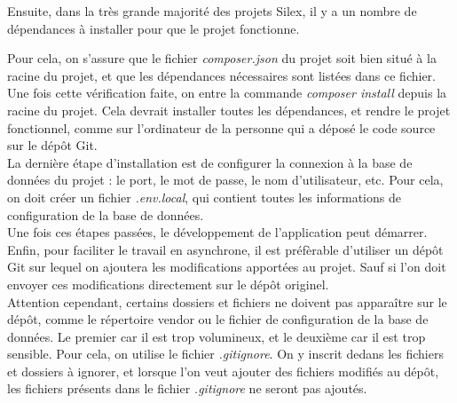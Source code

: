 \documentclass[12pt,a4paper]{article}
\begin{document}
	 Ensuite, dans la très grande majorité des projets Silex, il y a un nombre de dépendances à installer pour que le projet fonctionne. 
	
	Pour cela, on s'assure que le fichier \textit{composer.json} du projet soit bien situé à la racine du projet, et que les dépendances nécessaires sont listées dans ce fichier. Une fois cette vérification faite, on entre la commande \textit{composer install} depuis la racine du projet. Cela devrait installer toutes les dépendances, et rendre le projet fonctionnel, comme sur l'ordinateur de la personne qui a déposé le code source sur le dépôt Git. \\
	 
	 La dernière étape d'installation est de configurer la connexion à la base de données du projet : le port, le mot de passe, le nom d'utilisateur, etc. Pour cela, on doit créer un fichier \textit{.env.local}, qui contient toutes les informations de configuration de la base de données. \\
	 
	Une fois ces étapes passées, le développement de l'application peut démarrer.	 \\
	 
	 Enfin, pour faciliter le travail en asynchrone, il est préfèrable d'utiliser un dépôt Git sur lequel on ajoutera les modifications apportées au projet. Sauf si l'on doit envoyer ces modifications directement sur le dépôt originel. \\
	 Attention cependant, certains dossiers et fichiers ne doivent pas apparaître sur le dépôt, comme le répertoire vendor ou le fichier de configuration de la base de données. Le premier car il est trop volumineux, et le deuxième car il est trop sensible. Pour cela, on utilise le fichier \textit{.gitignore}. On y inscrit dedans les fichiers et dossiers à ignorer, et lorsque l'on veut ajouter des fichiers modifiés au dépôt, les fichiers présents dans le fichier \textit{.gitignore} ne seront pas ajoutés. 


\printbibliography
\end{document}
